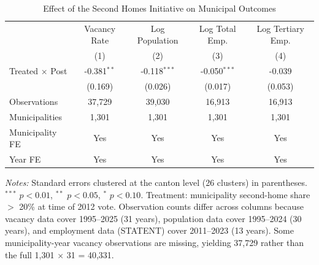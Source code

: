 \begin{table}[htbp]
\centering
\caption{Effect of the Second Homes Initiative on Municipal Outcomes}
\label{tab:did_main}
\small
\begin{tabular}{lcccc}
\toprule
  & Vacancy Rate & Log Population & Log Total Emp. & Log Tertiary Emp. \\
 & (1) & (2) & (3) & (4) \\
\midrule
Treated $\times$ Post & -0.381$^{**}$ & -0.118$^{***}$ & -0.050$^{***}$ & -0.039 \\
  & (0.169) & (0.026) & (0.017) & (0.053) \\[6pt]
Observations & 37,729 & 39,030 & 16,913 & 16,913 \\
Municipalities & 1,301 & 1,301 & 1,301 & 1,301 \\
Municipality FE & Yes & Yes & Yes & Yes \\
Year FE & Yes & Yes & Yes & Yes \\
\bottomrule
\end{tabular}
\par\vspace{0.3em}
\begin{minipage}{\linewidth}
\footnotesize \textit{Notes:} Standard errors clustered at the canton level (26 clusters) in parentheses.
$^{***}$ $p<0.01$, $^{**}$ $p<0.05$, $^{*}$ $p<0.10$.
Treatment: municipality second-home share $>$ 20\% at time of 2012 vote.
Observation counts differ across columns because vacancy data cover 1995--2025 (31 years),
population data cover 1995--2024 (30 years), and employment data (STATENT) cover 2011--2023 (13 years).
Some municipality-year vacancy observations are missing, yielding 37,729 rather than the full 1,301 $\times$ 31 = 40,331.
\end{minipage}
\end{table}
